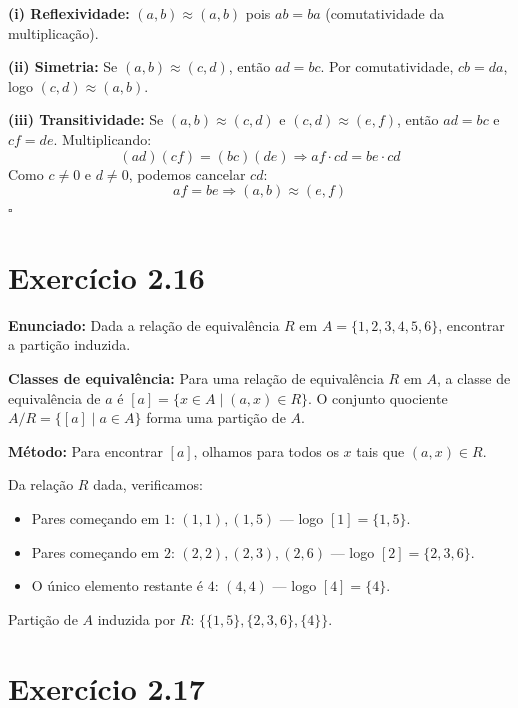 \documentclass[12pt,a4paper]{article}
\begin{document}
\textbf{(i) Reflexividade:} $(a,b) \approx (a,b)$ pois $ab = ba$ (comutatividade da multiplicação).

\textbf{(ii) Simetria:} Se $(a,b) \approx (c,d)$, então $ad = bc$. Por comutatividade, $cb = da$, logo $(c,d) \approx (a,b)$.

\textbf{(iii) Transitividade:} Se $(a,b) \approx (c,d)$ e $(c,d) \approx (e,f)$, então $ad = bc$ e $cf = de$. Multiplicando:
\[
(ad)(cf) = (bc)(de) \Rightarrow af \cdot cd = be \cdot cd
\]
Como $c \neq 0$ e $d \neq 0$, podemos cancelar $cd$:
\[
af = be \Rightarrow (a,b) \approx (e,f)
\]
\hfill$\square$

\section*{Exercício 2.16}

\textbf{Enunciado:} Dada a relação de equivalência $R$ em $A = \{1,2,3,4,5,6\}$, encontrar a partição induzida.

\begin{teoribox}
\textbf{Classes de equivalência:} Para uma relação de equivalência $R$ em $A$, a classe de equivalência de $a$ é $[a] = \{x \in A \mid (a,x) \in R\}$. O conjunto quociente $A/R = \{[a] \mid a \in A\}$ forma uma partição de $A$.
\end{teoribox}

\textbf{Método:} Para encontrar $[a]$, olhamos para todos os $x$ tais que $(a,x) \in R$.

Da relação $R$ dada, verificamos:
\begin{itemize}
  \item Pares começando em $1$: $(1,1),(1,5)$ --- logo $[1] = \{1,5\}$.
  \item Pares começando em $2$: $(2,2),(2,3),(2,6)$ --- logo $[2] = \{2,3,6\}$.
  \item O único elemento restante é $4$: $(4,4)$ --- logo $[4] = \{4\}$.
\end{itemize}

Partição de $A$ induzida por $R$: $\{\{1,5\},\{2,3,6\},\{4\}\}$.

\section*{Exercício 2.17}
\end{document}
